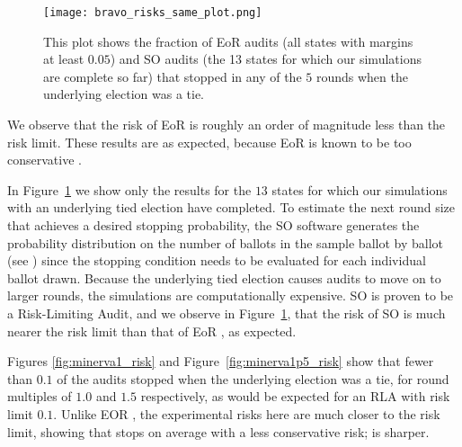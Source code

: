 \begin{figure}
\begin{centering}
\texttt{[image: bravo\_risks\_same\_plot.png]}
\caption{This plot shows the fraction of EoR \BRAVO audits (all states with margins at least $0.05$) and SO \BRAVO audits (the 13 states for which our simulations are complete so far) that stopped in any of the $5$ rounds when the underlying election was a tie.}
\label{fig:bravo_risk}
\end{centering}
\end{figure}

We observe that the risk of EoR \BRAVO is roughly
an order of magnitude less than the risk limit. 
These results are as expected, because EoR \BRAVO is known to be too conservative \cite{usenix_minerva}.  

In Figure~\ref{fig:bravo_risk} we show only the results for the $13$
states for which our simulations with an underlying tied election have completed.
To estimate the next round size that achieves a desired stopping probability,
the SO \BRAVO software generates the probability distribution on the number of ballots in the sample ballot by ballot (see \cite{usenix_minerva}) since
the stopping condition needs to be evaluated for each individual ballot drawn.
Because the underlying tied election causes audits to move on to larger rounds, 
the simulations are computationally expensive. SO \BRAVO is proven to be a Risk-Limiting Audit,
and we observe in Figure~\ref{fig:bravo_risk},
that the risk of SO \BRAVO is much
nearer the risk limit than that of EoR \BRAVO, as expected. 



Figures \ref{fig:minerva1_risk} and Figure~\ref{fig:minerva1p5_risk} show that fewer than $0.1$ of the audits stopped when the underlying election was a tie, for round multiples of $1.0$ and $1.5$ respectively, as would be expected for an RLA with risk limit $0.1$. 
Unlike EOR \BRAVO, the experimental risks here are much closer to the risk limit,
showing that \Minerva stops on average with a less conservative risk; \Minerva is sharper.

